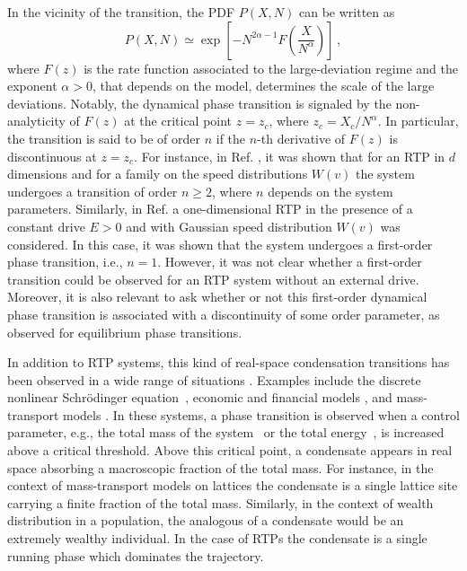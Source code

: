 \documentclass[aps,pre,twocolumn,superscriptaddress,showpacs]{revtex4-1}
\begin{document}
In the vicinity of the transition, the PDF $P(X,N)$ can be written as
\begin{equation}
P(X,N)\simeq \exp\left[-N^{2\alpha-1} F\left(\frac{X}{N^\alpha}\right)\right]\,,
\label{definiton_F}
\end{equation}
where $F(z)$ is the rate function associated to the large-deviation regime and the exponent $\alpha>0$, that depends on the model, determines the scale of the large deviations. Notably, the dynamical phase
transition is signaled by the non-analyticity of $F(z)$ at the
critical point $z=z_c$, where $z_c=X_c/N^{\alpha}$. In particular, the
transition is said to be of order $n$ if the $n$-th derivative of
$F(z)$ is discontinuous at $z=z_c$. For instance, in
Ref. \cite{MLDM21}, it was shown that for an RTP in $d$ dimensions and
for a family on the speed distributions $W(v)$ the system undergoes a
transition of order $n\geq 2$, where $n$ depends on the system
parameters. Similarly, in Ref. \cite{GM19} a one-dimensional RTP in
the presence of a constant drive $E>0$ and with Gaussian speed
distribution $W(v)$ was considered. In this case, it was shown that
the system undergoes a first-order phase transition, i.e.,
  $n=1$. However, it was not clear whether a first-order
transition could be observed for an RTP system without an
external drive. Moreover, it is also relevant to ask whether or not
this first-order dynamical phase transition is associated with a
discontinuity of some order parameter, as observed for equilibrium phase transitions.




In addition to RTP systems, this kind of real-space condensation
transitions has been observed in a wide range of situations
\cite{EH05,M2008}.  Examples include the discrete nonlinear
Schr\"odinger equation~\cite{RCK2000,SPP17,GIL21,GIL21b,GIP21}, economic and
financial models \cite{BM2000,BJJ2002,FZV13}, and mass-transport
models
\cite{MEZ2005,EMZ06,EHM06,EM08,EMPT10,SEM2014,SEM2014b,SEM2016,GB2017}.
In these systems, a phase transition is observed when a control
parameter, e.g., the total mass of the system~\cite{MEZ2005}
or the total energy~\cite{GIL21}, is increased above a critical
threshold. Above this critical point, a condensate appears in real
space absorbing a macroscopic fraction of the total mass. For
instance, in the context of mass-transport models on lattices the
condensate is a single lattice site carrying a finite fraction of the
total mass. Similarly, in the context of wealth distribution in a
population, the analogous of a condensate would be an extremely
wealthy individual. In the case of RTPs the condensate is a single
running phase which dominates the trajectory. 
\end{document}
